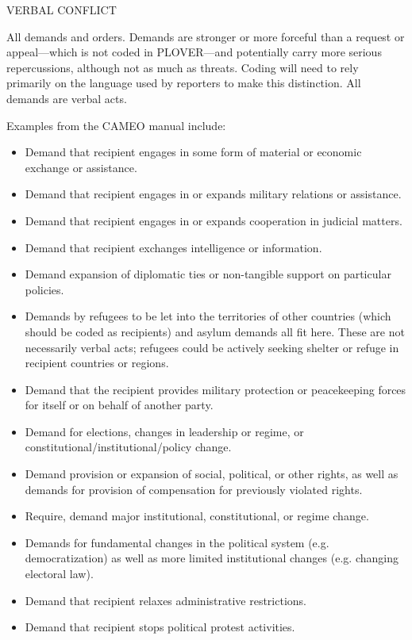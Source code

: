 \documentclass[11pt]{report}
\begin{document}
\textsf{VERBAL CONFLICT} \vspace{8pt}


All demands and orders. Demands are stronger or more forceful than a request or appeal---which is not coded in PLOVER---and potentially carry more serious repercussions, although not as much as threats. Coding will need to rely primarily on the language used by reporters to make this distinction.  All demands are verbal acts. 

Examples from the CAMEO manual include:

\begin{itemize}
\item Demand that recipient engages in some form of material or economic exchange or assistance.
\item Demand that recipient engages in or expands military relations or assistance.
\item Demand that recipient engages in or expands cooperation in judicial matters.
\item Demand that recipient exchanges intelligence or information.
\item Demand expansion of diplomatic ties or non-tangible support on particular policies.
\item Demands by refugees to be let into the territories of other countries (which should be coded as recipients) and asylum demands all fit here. These are not necessarily verbal acts; refugees could be actively seeking shelter or refuge in recipient countries or regions.
\item Demand that the recipient provides military protection or peacekeeping forces  for itself or on behalf of another party.
\item Demand for elections, changes in leadership or regime, or constitutional/institutional/policy change.
\item Demand provision or expansion of social, political, or other rights, as well as demands for provision of compensation for previously violated rights.
\item Require, demand major institutional, constitutional, or regime change.
\item Demands for fundamental changes in the political system (e.g. democratization) as well as more limited institutional changes (e.g. changing electoral law).
\item Demand that recipient relaxes administrative restrictions.
\item Demand that recipient stops political protest activities.

\end{itemize}
\end{document}
